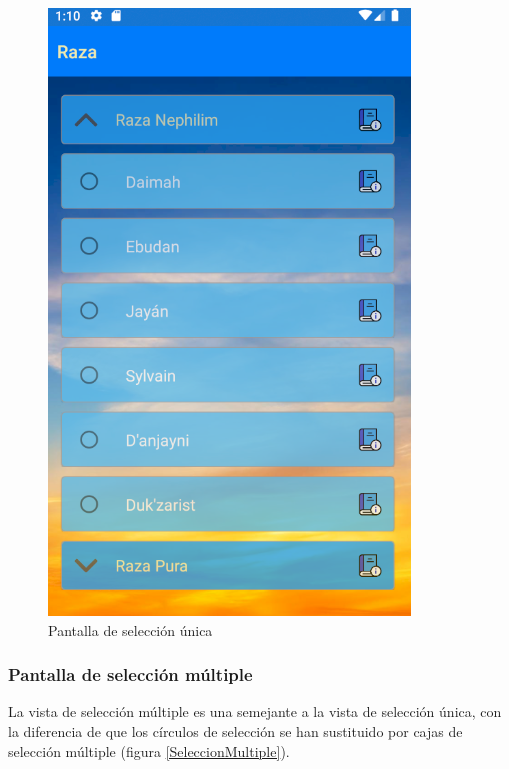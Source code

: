 \begin{figure}[H]
    \centering
    \includegraphics[scale=0.3]{Figures/Capturas/SeleccionUnicaGrupoAbierto.png}
    \caption{Pantalla de selección única}
    \label{SeleccionUnicaGrupoAbierto}    
\end{figure}

\subsubsection{Pantalla de selección múltiple}
La vista de selección múltiple es una semejante a la vista de selección única, con la diferencia de que los círculos de selección 
se han sustituido por cajas de selección múltiple (figura \ref*{SeleccionMultiple}).

